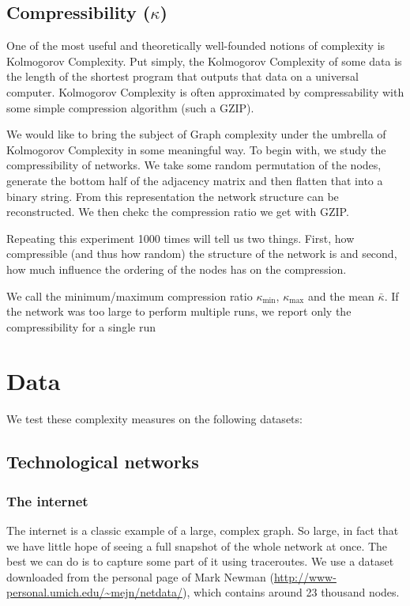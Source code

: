 \documentclass{article}
\theoremstyle{definition}
\begin{document}
\subsection*{Compressibility ($\kappa$)}

One of the most useful and theoretically well-founded notions of complexity is Kolmogorov Complexity. Put simply, the Kolmogorov Complexity of some data is the length of the shortest program that outputs that data on a universal computer. Kolmogorov Complexity is often approximated by compressability with some simple compression algorithm (such a GZIP). \cite{li2008introduction}

We would like to bring the subject of Graph complexity under the umbrella of Kolmogorov Complexity in some meaningful way. To begin with, we study the compressibility of networks. We take some random permutation of the nodes, generate the bottom half of the adjacency matrix and then flatten that into a binary string. From this representation the network structure can be reconstructed. We then chekc the compression ratio we get with GZIP.

Repeating this experiment 1000 times will tell us two things. First, how compressible (and thus how random) the structure of the network is and second, how much influence the ordering of the nodes has on the compression. 

We call the minimum/maximum compression ratio $\kappa_{\mbox{min}}$, $\kappa_{\mbox{max}}$ and the mean $ \bar{\kappa}$. If the network was too large to perform multiple runs, we report only the compressibility for a single run

\section*{Data}

We test these complexity measures on the following datasets:

\subsection*{Technological networks}

\subsubsection*{The internet}

The internet is a classic example of a large, complex graph. So large, in fact that we have little hope of seeing a full snapshot of the whole network at once. The best we can do is to capture some part of it using traceroutes. We use a dataset downloaded from the personal page of Mark Newman (\url{http://www-personal.umich.edu/~mejn/netdata/}), which contains around 23 thousand nodes.
\end{document}
